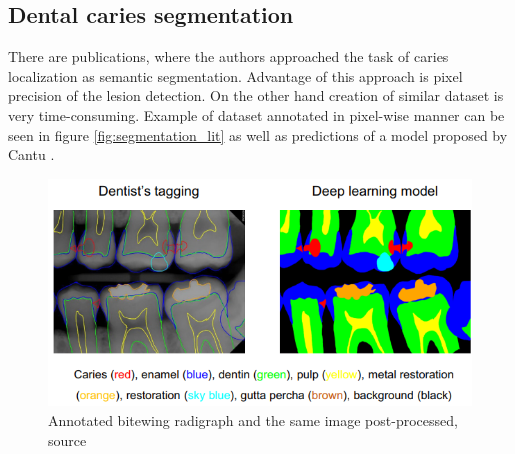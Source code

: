 \subsection{Dental caries segmentation}
There are publications, where the authors approached the task of caries localization as semantic segmentation. Advantage of this approach is pixel precision of the lesion detection. On the other hand creation of similar dataset is very time-consuming. Example of dataset annotated in pixel-wise manner can be seen in figure \ref{fig:segmentation_lit} as well as predictions of a model proposed by Cantu \cite{Cantu2020}.

\begin{figure}
    \centering
    \includegraphics[width=\linewidth]{images/segmentation_bitewing_rich.png}
    \caption{Annotated bitewing radigraph and the same image post-processed, source \cite{Lee2021}}
    \label{fig:bitewing_dense}
\end{figure}

